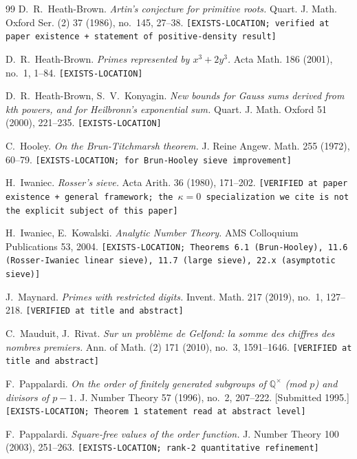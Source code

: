 \documentclass[11pt,a4paper]{article}
\theoremstyle{plain}
\theoremstyle{definition}
\theoremstyle{remark}
\begin{document}
\begin{thebibliography}{99}
D.~R.~Heath-Brown.
\emph{Artin's conjecture for primitive roots.}
Quart. J. Math. Oxford Ser. (2) 37 (1986), no.~145, 27--38.
\texttt{[EXISTS-LOCATION; verified at paper existence + statement of
positive-density result]}

D.~R.~Heath-Brown.
\emph{Primes represented by $x^{3} + 2 y^{3}$.}
Acta Math. 186 (2001), no.~1, 1--84.
\texttt{[EXISTS-LOCATION]}

D.~R.~Heath-Brown, S.~V.~Konyagin.
\emph{New bounds for Gauss sums derived from kth powers, and for
Heilbronn's exponential sum.}
Quart. J. Math. Oxford 51 (2000), 221--235.
\texttt{[EXISTS-LOCATION]}

C.~Hooley.
\emph{On the Brun-Titchmarsh theorem.}
J. Reine Angew. Math. 255 (1972), 60--79.
\texttt{[EXISTS-LOCATION; for Brun-Hooley sieve improvement]}

H.~Iwaniec.
\emph{Rosser's sieve.}
Acta Arith. 36 (1980), 171--202.
\texttt{[VERIFIED at paper existence + general framework; the $\kappa
= 0$ specialization we cite is not the explicit subject of this
paper]}

H.~Iwaniec, E.~Kowalski.
\emph{Analytic Number Theory.}
AMS Colloquium Publications 53, 2004.
\texttt{[EXISTS-LOCATION; Theorems 6.1 (Brun-Hooley), 11.6
(Rosser-Iwaniec linear sieve), 11.7 (large sieve), 22.x (asymptotic
sieve)]}

J.~Maynard.
\emph{Primes with restricted digits.}
Invent. Math. 217 (2019), no.~1, 127--218.
\texttt{[VERIFIED at title and abstract]}

C.~Mauduit, J.~Rivat.
\emph{Sur un probl\`eme de Gelfond: la somme des chiffres des nombres
premiers.}
Ann. of Math. (2) 171 (2010), no.~3, 1591--1646.
\texttt{[VERIFIED at title and abstract]}

F.~Pappalardi.
\emph{On the order of finitely generated subgroups of
$\mathbb{Q}^{\times}$ (mod $p$) and divisors of $p - 1$.}
J. Number Theory 57 (1996), no.~2, 207--222.
[Submitted 1995.]
\texttt{[EXISTS-LOCATION; Theorem 1 statement read at abstract level]}

F.~Pappalardi.
\emph{Square-free values of the order function.}
J. Number Theory 100 (2003), 251--263.
\texttt{[EXISTS-LOCATION; rank-2 quantitative refinement]}


\end{thebibliography}
\end{document}

